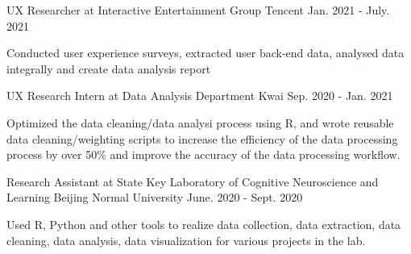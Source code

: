 
\begin{cventries}


  \cventry
    {UX Researcher at Interactive Entertainment Group} %
    {Tencent} %
    {} %
    {Jan. 2021 - July. 2021} %
    {
      \begin{cvitems} %
        \item {Conducted user experience surveys, extracted user back-end data, analysed data integrally and create data analysis report  }
      \end{cvitems}
    }
    
  \cventry
    {UX Research Intern at Data Analysis Department} %
    {Kwai} %
    {} %
    {Sep. 2020 - Jan. 2021} %
    {
      \begin{cvitems} %
        \item {Optimized the data cleaning/data analysi process using R, and wrote reusable data cleaning/weighting scripts to increase the efficiency of the data processing process by over 50\% and improve the accuracy of the data processing workflow.}
      \end{cvitems}
    }
  \cventry
    {Research Assistant at State Key Laboratory of Cognitive Neuroscience and Learning} %
    {Beijing Normal University} %
    {} %
    {June. 2020 - Sept. 2020} %
    {
      \begin{cvitems} %
        \item {Used R, Python and other tools to realize data collection, data extraction, data cleaning, data analysis, data visualization for various projects in the lab.}
      \end{cvitems}
    }
    

\end{cventries}
